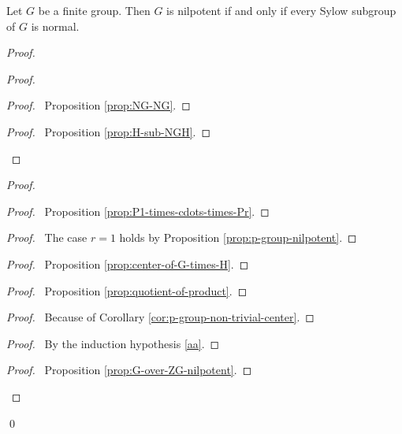 \begin{cor}
Let $G$ be a finite group. Then $G$ is nilpotent if and only if every Sylow subgroup of $G$ is normal.
\end{cor}

\begin{proof}
\pf
{}
\begin{proof}
\begin{proof}
	\pf\ Proposition \ref{prop:NG-NG}.
\end{proof}
\begin{proof}
	\pf\ Proposition \ref{prop:H-sub-NGH}.
\end{proof}
\end{proof}
\begin{proof}
	\begin{proof}
		\pf\ Proposition \ref{prop:P1-times-cdots-times-Pr}.
	\end{proof}
	\begin{proof}
		\pf\ The case $r = 1$ holds by Proposition \ref{prop:p-group-nilpotent}.
	\end{proof}
	\begin{proof}
		\pf\ Proposition \ref{prop:center-of-G-times-H}.
	\end{proof}
	\begin{proof}
		\pf\ Proposition \ref{prop:quotient-of-product}.
	\end{proof}
	\begin{proof}
		\pf\ Because of Corollary \ref{cor:p-group-non-trivial-center}.
	\end{proof}
	\begin{proof}
		\pf\ By the induction hypothesis \ref{aa}.
	\end{proof}
	\begin{proof}
		\pf\ Proposition \ref{prop:G-over-ZG-nilpotent}.
	\end{proof}
\end{proof}
\qed
\end{proof}


